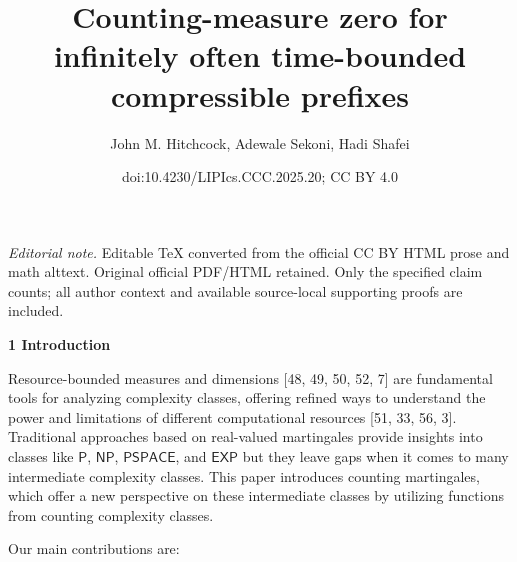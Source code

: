 \documentclass[10pt,a4paper]{article}
\title{Counting-measure zero for infinitely often time-bounded compressible prefixes}
\author{John M. Hitchcock, Adewale Sekoni, Hadi Shafei}
\date{doi:10.4230/LIPIcs.CCC.2025.20; CC BY 4.0}
\begin{document}
\maketitle
\noindent\textit{Editorial note.} Editable TeX converted from the official CC BY HTML prose and math alttext. Original official PDF/HTML retained. Only the specified claim counts; all author context and available source-local supporting proofs are included.\par\medskip


\par\medskip\noindent\textbf{
1 Introduction}\par




Resource-bounded measures and dimensions [48, 49, 50, 52, 7] are fundamental tools for analyzing complexity classes, offering refined ways to understand the power and limitations of different computational resources [51, 33, 56, 3].
Traditional approaches based on real-valued martingales provide insights into classes like $\mathsf{P}$, $\mathsf{NP}$, $\mathsf{PSPACE}$, and $\mathsf{EXP}$ but they leave gaps when it comes to many intermediate complexity classes. This paper introduces counting martingales, which offer a new perspective on these intermediate classes by utilizing functions from counting complexity classes.\par




Our main contributions are:\par
\end{document}
